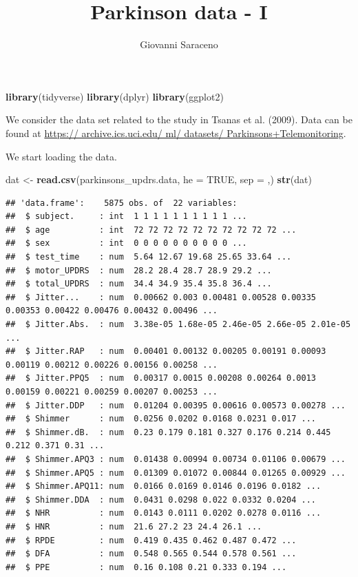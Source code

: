 \documentclass[
]{article}
\title{Parkinson data - I}
\author{Giovanni Saraceno}
\date{}
\newenvironment{Shaded}{\begin{snugshade}}{\end{snugshade}}
\newcommand{\AttributeTok}[1]{\textcolor[rgb]{0.13,0.29,0.53}{#1}}
\newcommand{\ConstantTok}[1]{\textcolor[rgb]{0.56,0.35,0.01}{#1}}
\newcommand{\FunctionTok}[1]{\textcolor[rgb]{0.13,0.29,0.53}{\textbf{#1}}}
\newcommand{\NormalTok}[1]{#1}
\newcommand{\OtherTok}[1]{\textcolor[rgb]{0.56,0.35,0.01}{#1}}
\newcommand{\StringTok}[1]{\textcolor[rgb]{0.31,0.60,0.02}{#1}}
\begin{document}
\maketitle

{
\setcounter{tocdepth}{2}
\tableofcontents
}
\begin{Shaded}
\begin{Highlighting}[]
\FunctionTok{library}\NormalTok{(tidyverse)}
\FunctionTok{library}\NormalTok{(dplyr)}
\FunctionTok{library}\NormalTok{(ggplot2)}
\end{Highlighting}
\end{Shaded}

We consider the data set related to the study in Tsanas et al. (2009).
Data can be found at
\href{https://\%20archive.ics.uci.edu/\%20ml/\%20datasets/\%20Parkinsons+Telemonitoring}{https://
archive.ics.uci.edu/ ml/ datasets/ Parkinsons+Telemonitoring}.

We start loading the data.

\begin{Shaded}
\begin{Highlighting}[]
\NormalTok{dat }\OtherTok{\textless{}{-}} \FunctionTok{read.csv}\NormalTok{(}\StringTok{\textquotesingle{}parkinsons\_updrs.data\textquotesingle{}}\NormalTok{, }\AttributeTok{he =} \ConstantTok{TRUE}\NormalTok{, }\AttributeTok{sep =} \StringTok{\textquotesingle{},\textquotesingle{}}\NormalTok{)}
\FunctionTok{str}\NormalTok{(dat)}
\end{Highlighting}
\end{Shaded}

\begin{verbatim}
## 'data.frame':    5875 obs. of  22 variables:
##  $ subject.     : int  1 1 1 1 1 1 1 1 1 1 ...
##  $ age          : int  72 72 72 72 72 72 72 72 72 72 ...
##  $ sex          : int  0 0 0 0 0 0 0 0 0 0 ...
##  $ test_time    : num  5.64 12.67 19.68 25.65 33.64 ...
##  $ motor_UPDRS  : num  28.2 28.4 28.7 28.9 29.2 ...
##  $ total_UPDRS  : num  34.4 34.9 35.4 35.8 36.4 ...
##  $ Jitter...    : num  0.00662 0.003 0.00481 0.00528 0.00335 0.00353 0.00422 0.00476 0.00432 0.00496 ...
##  $ Jitter.Abs.  : num  3.38e-05 1.68e-05 2.46e-05 2.66e-05 2.01e-05 ...
##  $ Jitter.RAP   : num  0.00401 0.00132 0.00205 0.00191 0.00093 0.00119 0.00212 0.00226 0.00156 0.00258 ...
##  $ Jitter.PPQ5  : num  0.00317 0.0015 0.00208 0.00264 0.0013 0.00159 0.00221 0.00259 0.00207 0.00253 ...
##  $ Jitter.DDP   : num  0.01204 0.00395 0.00616 0.00573 0.00278 ...
##  $ Shimmer      : num  0.0256 0.0202 0.0168 0.0231 0.017 ...
##  $ Shimmer.dB.  : num  0.23 0.179 0.181 0.327 0.176 0.214 0.445 0.212 0.371 0.31 ...
##  $ Shimmer.APQ3 : num  0.01438 0.00994 0.00734 0.01106 0.00679 ...
##  $ Shimmer.APQ5 : num  0.01309 0.01072 0.00844 0.01265 0.00929 ...
##  $ Shimmer.APQ11: num  0.0166 0.0169 0.0146 0.0196 0.0182 ...
##  $ Shimmer.DDA  : num  0.0431 0.0298 0.022 0.0332 0.0204 ...
##  $ NHR          : num  0.0143 0.0111 0.0202 0.0278 0.0116 ...
##  $ HNR          : num  21.6 27.2 23 24.4 26.1 ...
##  $ RPDE         : num  0.419 0.435 0.462 0.487 0.472 ...
##  $ DFA          : num  0.548 0.565 0.544 0.578 0.561 ...
##  $ PPE          : num  0.16 0.108 0.21 0.333 0.194 ...
\end{verbatim}
\end{document}
